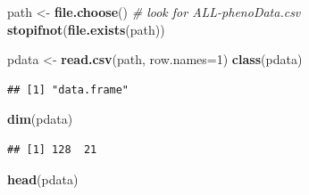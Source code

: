 \documentclass[]{article}
\newenvironment{Shaded}{\begin{snugshade}}{\end{snugshade}}
\newcommand{\KeywordTok}[1]{\textcolor[rgb]{0.13,0.29,0.53}{\textbf{#1}}}
\newcommand{\DataTypeTok}[1]{\textcolor[rgb]{0.13,0.29,0.53}{#1}}
\newcommand{\DecValTok}[1]{\textcolor[rgb]{0.00,0.00,0.81}{#1}}
\newcommand{\StringTok}[1]{\textcolor[rgb]{0.31,0.60,0.02}{#1}}
\newcommand{\CommentTok}[1]{\textcolor[rgb]{0.56,0.35,0.01}{\textit{#1}}}
\newcommand{\NormalTok}[1]{#1}
\theoremstyle{definition}
\theoremstyle{definition}
\theoremstyle{remark}
\begin{document}
\begin{Shaded}
\begin{Highlighting}[]
\NormalTok{path <-}\StringTok{ }\KeywordTok{file.choose}\NormalTok{()         }\CommentTok{# look for ALL-phenoData.csv}
\KeywordTok{stopifnot}\NormalTok{(}\KeywordTok{file.exists}\NormalTok{(path))}
\end{Highlighting}
\end{Shaded}

\begin{Shaded}
\begin{Highlighting}[]
\NormalTok{pdata <-}\StringTok{ }\KeywordTok{read.csv}\NormalTok{(path, }\DataTypeTok{row.names=}\DecValTok{1}\NormalTok{)}
\KeywordTok{class}\NormalTok{(pdata)}
\end{Highlighting}
\end{Shaded}

\begin{verbatim}
## [1] "data.frame"
\end{verbatim}

\begin{Shaded}
\begin{Highlighting}[]
\KeywordTok{dim}\NormalTok{(pdata)}
\end{Highlighting}
\end{Shaded}

\begin{verbatim}
## [1] 128  21
\end{verbatim}

\begin{Shaded}
\begin{Highlighting}[]
\KeywordTok{head}\NormalTok{(pdata)}
\end{Highlighting}
\end{Shaded}
\end{document}
